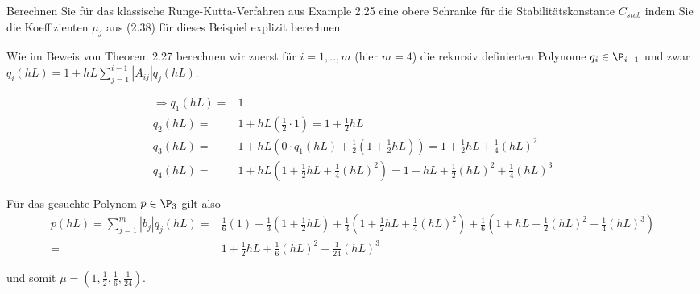 \begin{exercise}

Berechnen Sie für das klassische Runge-Kutta-Verfahren aus Example 2.25 eine obere Schranke für die Stabilitätskonstante $C_{stab}$ indem Sie die Koeffizienten $\mu_{j}$ aus (2.38) für dieses Beispiel explizit berechnen.

\end{exercise}

\begin{solution}

Wie im Beweis von Theorem 2.27 berechnen wir zuerst für $i=1,..,m$ (hier $m=4$) die rekursiv definierten Polynome $q_{i} \in \P_{i-1}$ und zwar $q_{i}(hL)= 1 + hL\sum_{j=1}^{i-1}|A_{ij}|q_{j}(hL)$.

\begin{align*}
    \Rightarrow q_{1}(hL) =& 1 \\
    q_{2}(hL) =& 1 + hL(\frac{1}{2} \cdot 1) = 1 + \frac{1}{2}hL \\
     q_{3}(hL) =& 1 + hL(0 \cdot q_{1}(hL) + \frac{1}{2}(1+\frac{1}{2}hL)) = 1 + \frac{1}{2}hL + \frac{1}{4}(hL)^{2} \\
     q_{4}(hL) =& 1 + hL(1 + \frac{1}{2}hL + \frac{1}{4}(hL)^{2}) = 1 + hL + \frac{1}{2}(hL)^{2} + \frac{1}{4}(hL)^{3}
\end{align*}

Für das gesuchte Polynom $p \in \P_{3}$ gilt also
 \begin{align*}
     p(hL) = \sum_{j=1}^{m}|b_{j}|q_{j}(hL) =& \frac{1}{6}(1) + \frac{1}{3}(1 + \frac{1}{2}hL) + \frac{1}{3}(1 + \frac{1}{2}hL + \frac{1}{4}(hL)^{2}) + \frac{1}{6}(1 + hL + \frac{1}{2}(hL)^{2} + \frac{1}{4}(hL)^{3})  \\
     =& 1 + \frac{1}{2}hL + \frac{1}{6}(hL)^{2} + \frac{1}{24}(hL)^{3}
 \end{align*}

 und somit $\mu = (1,\frac{1}{2},\frac{1}{6},\frac{1}{24})$.

\end{solution}
